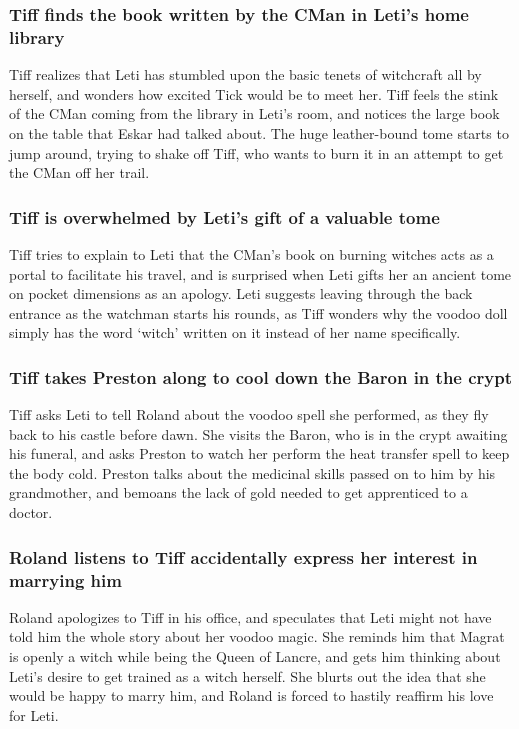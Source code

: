 \subsubsection{\Gls{Tiff} finds the book written by the \Gls{CMan} in \Gls{Leti}'s home library}
\Gls{Tiff} realizes that \Gls{Leti} has stumbled upon the basic tenets of witchcraft all by herself,
and wonders how excited \Gls{Tick} would be to meet her. \Gls{Tiff} feels the stink of the
\Gls{CMan} coming from the library in \Gls{Leti}'s room, and notices the large book on the table
that \Gls{Eskar} had talked about. The huge leather-bound tome starts to jump around, trying to
shake off \Gls{Tiff}, who wants to burn it in an attempt to get the \Gls{CMan} off her trail.

\subsubsection{\Gls{Tiff} is overwhelmed by \Gls{Leti}'s gift of a valuable tome}
\Gls{Tiff} tries to explain to \Gls{Leti} that the \Gls{CMan}'s book on burning witches acts as a
portal to facilitate his travel, and is surprised when \Gls{Leti} gifts her an ancient tome on
pocket dimensions as an apology. \Gls{Leti} suggests leaving through the back entrance as the
watchman starts his rounds, as \Gls{Tiff} wonders why the voodoo doll simply has the word `witch'
written on it instead of her name specifically.

\subsubsection{\Gls{Tiff} takes \Gls{Preston} along to cool down the \Gls{Baron} in the crypt}
\Gls{Tiff} asks \Gls{Leti} to tell \Gls{Roland} about the voodoo spell she performed, as they fly
back to his castle before dawn. She visits the \Gls{Baron}, who is in the crypt awaiting his
funeral, and asks \Gls{Preston} to watch her perform the heat transfer spell to keep the body cold.
\Gls{Preston} talks about the medicinal skills passed on to him by his grandmother, and bemoans the
lack of gold needed to get apprenticed to a doctor.

\subsubsection{\Gls{Roland} listens to \Gls{Tiff} accidentally express her interest in marrying
    him}
\Gls{Roland} apologizes to \Gls{Tiff} in his office, and speculates that \Gls{Leti} might not have
told him the whole story about her voodoo magic. She reminds him that \Gls{Magrat} is openly a witch
while being the Queen of Lancre, and gets him thinking about \Gls{Leti}'s desire to get trained as a
witch herself. She blurts out the idea that she would be happy to marry him, and \Gls{Roland} is
forced to hastily reaffirm his love for \Gls{Leti}.

